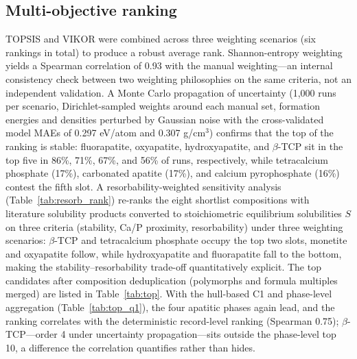 \documentclass[11pt,a4paper]{article}
\begin{document}
\subsection{Multi-objective ranking}\label{sec:ranking}
TOPSIS and VIKOR were combined across three weighting scenarios (six rankings in total) to produce a robust average rank. Shannon-entropy weighting yields a Spearman correlation of 0.93 with the manual weighting---an internal consistency check between two weighting philosophies on the same criteria, not an independent validation. A Monte Carlo propagation of uncertainty (1{,}000 runs per scenario, Dirichlet-sampled weights around each manual set, formation energies and densities perturbed by Gaussian noise with the cross-validated model MAEs of 0.297 eV/atom and 0.307 g/cm$^3$) confirms that the top of the ranking is stable: fluorapatite, oxyapatite, hydroxyapatite, and $\beta$-TCP sit in the top five in 86\%, 71\%, 67\%, and 56\% of runs, respectively, while tetracalcium phosphate (17\%), carbonated apatite (17\%), and calcium pyrophosphate (16\%) contest the fifth slot. A resorbability-weighted sensitivity analysis (Table~\ref{tab:resorb_rank}) re-ranks the eight shortlist compositions with literature solubility products converted to stoichiometric equilibrium solubilities $S$ on three criteria (stability, Ca/P proximity, resorbability) under three weighting scenarios: $\beta$-TCP and tetracalcium phosphate occupy the top two slots, monetite and oxyapatite follow, while hydroxyapatite and fluorapatite fall to the bottom, making the stability--resorbability trade-off quantitatively explicit. The top candidates after composition deduplication (polymorphs and formula multiples merged) are listed in Table~\ref{tab:top}. With the hull-based C1 and phase-level aggregation (Table~\ref{tab:top_q1}), the four apatitic phases again lead, and the ranking correlates with the deterministic record-level ranking (Spearman 0.75); $\beta$-TCP---order 4 under uncertainty propagation---sits outside the phase-level top 10, a difference the correlation quantifies rather than hides.
\end{document}
